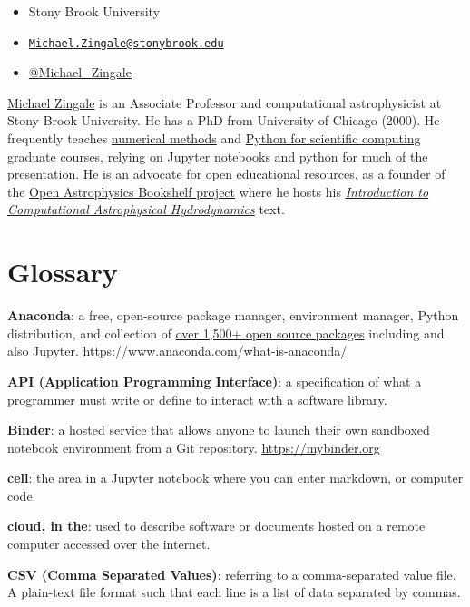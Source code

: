 \documentclass[]{book}
\providecommand{\tightlist}{%
  \setlength{\itemsep}{0pt}\setlength{\parskip}{0pt}}
\begin{document}
\begin{itemize}
\tightlist
\item
  Stony Brook University
\item
  \href{mailto:Michael.Zingale@stonybrook.edu}{\nolinkurl{Michael.Zingale@stonybrook.edu}}
\item
  \href{https://twitter.com/Michael_Zingale}{@Michael\_Zingale}
\end{itemize}

\href{http://www.astro.sunysb.edu/mzingale/}{Michael Zingale} is an
Associate Professor and computational astrophysicist at Stony Brook
University. He has a PhD from University of Chicago (2000). He
frequently teaches
\href{http://bender.astro.sunysb.edu/classes/numerical_methods/}{numerical
methods} and
\href{http://bender.astro.sunysb.edu/classes/python-science/}{Python for
scientific computing} graduate courses, relying on Jupyter notebooks and
python for much of the presentation. He is an advocate for open
educational resources, as a founder of the
\href{https://github.com/Open-Astrophysics-Bookshelf/}{Open Astrophysics
Bookshelf project} where he hosts his
\href{http://bender.astro.sunysb.edu/hydro_by_example/CompHydroTutorial.pdf}{\emph{Introduction
to Computational Astrophysical Hydrodynamics}} text.

\chapter{Glossary}\label{glossary}

\textbf{Anaconda}: a free, open-source package manager, environment
manager, Python distribution, and collection of
\href{https://docs.anaconda.com/anaconda/packages/pkg-docs/}{over 1,500+
open source packages} including and also Jupyter.
\url{https://www.anaconda.com/what-is-anaconda/}

\textbf{API (Application Programming Interface)}: a specification of
what a programmer must write or define to interact with a software
library.

\textbf{Binder}: a hosted service that allows anyone to launch their own
sandboxed notebook environment from a Git repository.
\url{https://mybinder.org}

\textbf{cell}: the area in a Jupyter notebook where you can enter
markdown, or computer code.

\textbf{cloud, in the}: used to describe software or documents hosted on
a remote computer accessed over the internet.

\textbf{CSV (Comma Separated Values)}: referring to a comma-separated
value file. A plain-text file format such that each line is a list of
data separated by commas.
\end{document}
